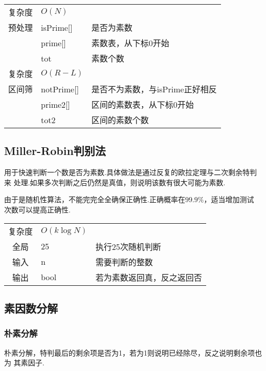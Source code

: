 \begin{longtable}{|c|l|l|}
复杂度 & $O(N)$ &  \\
预处理 & isPrime[] & 是否为素数 \\
 & prime[] & 素数表，从下标0开始 \\
 & tot & 素数个数 \\
 复杂度 & $O(R - L)$ &  \\
区间筛 & notPrime[] & 是否不为素数，与isPrime正好相反 \\
 & prime2[] & 区间的素数表，从下标0开始 \\
 & tot2 & 区间的素数个数 \\
\end{longtable}



    \subsection{Miller-Robin判别法}\small
用于快速判断一个数是否为素数.具体做法是通过反复的欧拉定理与二次剩余特判来
处理.如果多次判断之后仍然是真值，则说明该数有很大可能为素数.

由于是随机性算法，不能完完全全确保正确性.正确概率在$99.9\%$，适当增加测试
次数可以提高正确性.

\begin{longtable}{|c|l|l|}
复杂度 & $O(k\log N)$ &  \\
全局 & 25 & 执行25次随机判断 \\
输入 & n & 需要判断的整数 \\
输出 & bool & 若为素数返回真，反之返回否 \\
\end{longtable}



    \subsection{素因数分解}\small


        \subsubsection{朴素分解}\small
朴素分解，特判最后的剩余项是否为1，若为1则说明已经除尽，反之说明剩余项也为
其素因子.

